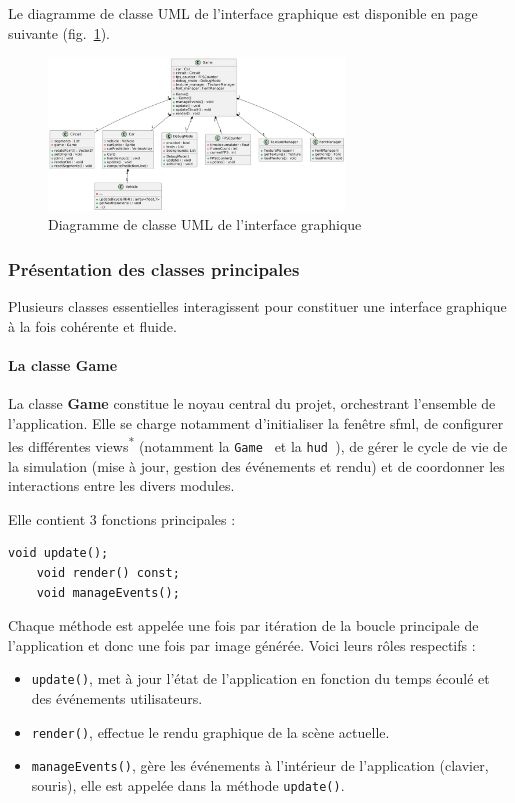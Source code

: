 Le diagramme de classe UML de l'interface graphique est disponible en page suivante (fig.~\ref{fig:uml_diagram}).

\begin{figure}[H]
    \centering
    \includegraphics[width=0.7\textwidth]{resources/classdiagram}
    \caption{Diagramme de classe UML de l'interface graphique}
    \label{fig:uml_diagram}
\end{figure}

\subsubsection{Présentation des classes principales}\label{subsubsec:presentation-des-classes-principales}
Plusieurs classes essentielles interagissent pour constituer une interface graphique à la fois cohérente et fluide.

\paragraph[Game]{La classe \textbf{Game}}\label{par:class_game}
La classe \textbf{Game} constitue le noyau central du projet, orchestrant l'ensemble de l'application.
Elle se charge notamment d'initialiser la fenêtre \gls{sfml}, de configurer les différentes \glspl{view}\textsuperscript{*} (notamment la \texttt{Game } et la \texttt{\gls{hud} }), de gérer le cycle de vie de la simulation (mise à jour, gestion des événements et rendu) et de coordonner les interactions entre les divers modules.

Elle contient 3 fonctions principales :
\begin{lstlisting}[style=CStyle, label={lst:game_class}]
    void update();
    void render() const;
    void manageEvents();
\end{lstlisting}
Chaque méthode est appelée une fois par itération de la boucle principale de l'application et donc une fois par image générée.
Voici leurs rôles respectifs :
\begin{itemize}
    \item \texttt{update()}, met à jour l'état de l'application en fonction du temps écoulé et des événements utilisateurs.
    \item \texttt{render()}, effectue le rendu graphique de la scène actuelle.
    \item \texttt{manageEvents()}, gère les événements à l'intérieur de l'application (clavier, souris), elle est appelée dans la méthode \texttt{update()}.
\end{itemize}

